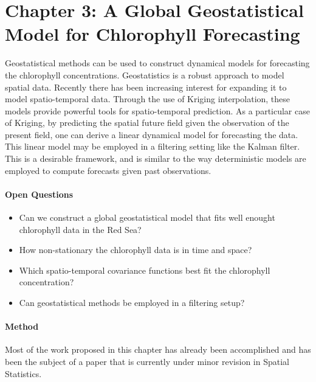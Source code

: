 \section{Chapter 3: A Global Geostatistical Model for Chlorophyll Forecasting}

Geostatistical methods can be used to construct dynamical models for
forecasting the chlorophyll concentrations. Geostatistics is a robust approach to
model spatial data.  Recently there has been increasing interest for expanding
it to model spatio-temporal data. Through the use of Kriging interpolation,
these models provide powerful tools for spatio-temporal prediction. As a
particular case of Kriging, by predicting the spatial future field given the
observation of the present field, one can derive a linear dynamical model for
forecasting the data. This linear model may be employed in a filtering setting
like the Kalman filter. This is a desirable framework, and is similar to the
way deterministic models are employed to compute forecasts given past
observations. 

\paragraph{Open Questions}

\begin{itemize}

\item Can we construct a global geostatistical model that fits well enought
chlorophyll data in the Red Sea?

\item How non-stationary the chlorophyll data is in time and space?

\item Which spatio-temporal covariance functions best fit the chlorophyll concentration?

\item Can geostatistical methods be employed in a filtering setup?

\end{itemize}

\paragraph{Method} 
\mbox{}

Most of the work proposed in this chapter has already been accomplished and has
been the subject of a paper that is currently under minor revision in Spatial 
Statistics.


